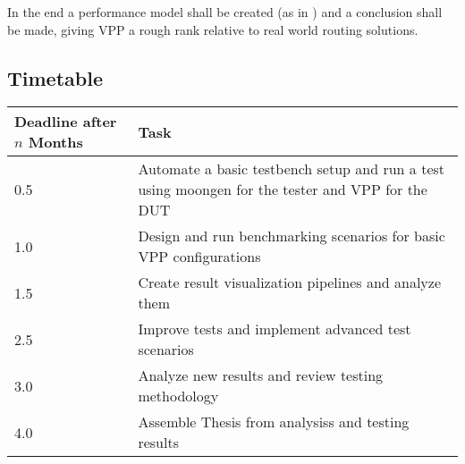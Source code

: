 \documentclass[NET,a4,12pt,ngerman]{netforms}
\begin{document}
In the end a performance model shall be created (as in \cite{compare-highperf})
and a conclusion shall be made, giving VPP a rough rank relative to real world
routing solutions.


\subsection*{Timetable}

\begin{tabular}{|l|p{10cm}|}
\hline
Deadline after $n$ Months & Task \\ \hline
0.5 & Automate a basic testbench setup and run a test using moongen for
the tester and VPP for the DUT \\ \hline
1.0 & Design and run benchmarking scenarios for basic VPP configurations \\ \hline
1.5 & Create result visualization pipelines and analyze them \\ \hline
2.5 & Improve tests and implement advanced test scenarios \\ \hline
3.0 & Analyze new results and review testing methodology \\ \hline
4.0 & Assemble Thesis from analysiss and testing results \\ \hline
\end{tabular}



\end{document}

